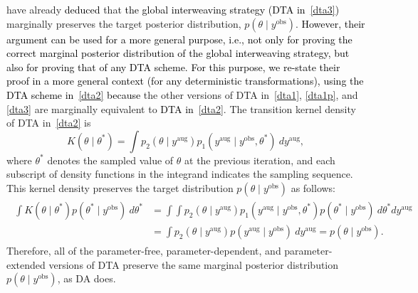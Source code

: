 \documentclass[12pt]{article}
\begin{document}
\cite{yu2011} have already \textcolor{black}{deduced} that \textcolor{black}{the global interweaving strategy (DTA in~\eqref{dta3})} marginally preserves the target posterior distribution, $p(\theta\mid y^{\textrm{obs}})$. \textcolor{black}{However, their argument can be used for a more general purpose, i.e., not only for proving the correct marginal posterior distribution of the global interweaving strategy, but also for proving that of any DTA scheme. For this purpose, we \textcolor{black}{re-state their proof in a more general context (for any deterministic transformations), using} the DTA scheme in~\eqref{dta2} because} the other versions of DTA in~\eqref{dta1}, \eqref{dta1p}, and \eqref{dta3} are marginally equivalent to \textcolor{black}{DTA in}~\eqref{dta2}. The transition kernel density of DTA in~\eqref{dta2} is
\begin{equation}\label{kernel}
K(\theta\mid\theta^\ast)=\int p_2(\theta\mid y^{\textrm{aug}})  p_1(y^{\textrm{aug}}\mid y^{\textrm{obs}}, \theta^\ast)~dy^{\textrm{aug}},
\end{equation}
where $\theta^\ast$ denotes the sampled value of $\theta$ at the previous iteration, and each subscript of  density functions in the integrand indicates the sampling sequence. This kernel density preserves the target  distribution $p(\theta\mid y^{\textrm{obs}})$ as follows:
\begin{align}
\begin{aligned}\label{stationary}
\int K(\theta\mid\theta^\ast)p(\theta^\ast\mid y^{\textrm{obs}})~d\theta^\ast&=\int\!\!\int p_2(\theta\mid y^{\textrm{aug}})  p_1(y^{\textrm{aug}}\mid y^{\textrm{obs}}, \theta^\ast)p(\theta^\ast\mid y^{\textrm{obs}})~d\theta^\ast dy^{\textrm{aug}}\\
&=\int p_2(\theta\mid y^{\textrm{aug}})  p(y^{\textrm{aug}}\mid y^{\textrm{obs}})~dy^{\textrm{aug}}=p(\theta\mid y^{\textrm{obs}}).
\end{aligned}
\end{align}
Therefore, all of the parameter-free, parameter-dependent, and parameter-extended versions of DTA  preserve the same marginal posterior distribution $p(\theta\mid y^{\textrm{obs}})$, as DA does. 
\end{document}
